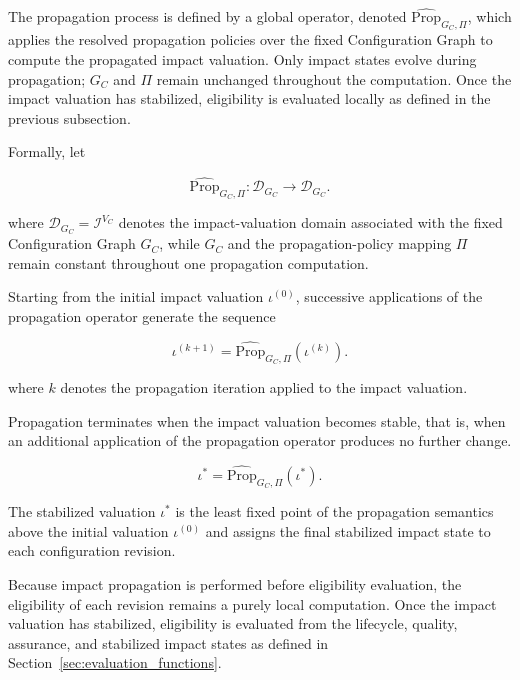 \documentclass[10pt]{article}
\begin{document}
The propagation process is defined by a global operator, denoted
$\widehat{\mathrm{Prop}}_{G_C,\Pi}$, which applies the resolved propagation policies over the fixed Configuration Graph to compute the propagated impact valuation. Only impact states evolve during propagation; $G_C$ and $\Pi$ remain unchanged throughout the computation. Once the impact valuation has stabilized, eligibility is evaluated locally as defined in the previous subsection.

Formally, let

\begin{equation}
	\label{eq:prop_operator}
	\widehat{\mathrm{Prop}}_{G_C,\Pi}
	:
	\mathcal{D}_{G_C}
	\rightarrow
	\mathcal{D}_{G_C}.
\end{equation}

where $\mathcal{D}_{G_C}=\mathcal{I}^{V_C}$ denotes the impact-valuation domain associated with the fixed Configuration Graph $G_C$, while $G_C$ and the propagation-policy mapping $\Pi$ remain constant throughout one propagation computation.

Starting from the initial impact valuation $\iota^{(0)}$, successive
applications of the propagation operator generate the sequence

\begin{equation}
	\label{eq:prop_iteration}
	\iota^{(k+1)}
	=
	\widehat{\mathrm{Prop}}_{G_C,\Pi}
	\!\left(
	\iota^{(k)}
	\right).
\end{equation}

where $k$ denotes the propagation iteration applied to the impact valuation.

Propagation terminates when the impact valuation becomes stable, that is, when an additional application of the propagation operator produces no further change.

\begin{equation}
	\label{eq:fixed_point}
	\iota^{*}
	=
	\widehat{\mathrm{Prop}}_{G_C,\Pi}
	\!\left(
	\iota^{*}
	\right).
\end{equation}

The stabilized valuation $\iota^{*}$ is the least fixed point of the
propagation semantics above the initial valuation $\iota^{(0)}$ and assigns the final stabilized impact state to each configuration revision.

Because impact propagation is performed before eligibility evaluation, the eligibility of each revision remains a purely local computation. Once the impact valuation has stabilized, eligibility is evaluated from the lifecycle, quality, assurance, and stabilized impact states as defined in Section~\ref{sec:evaluation_functions}.
\end{document}
